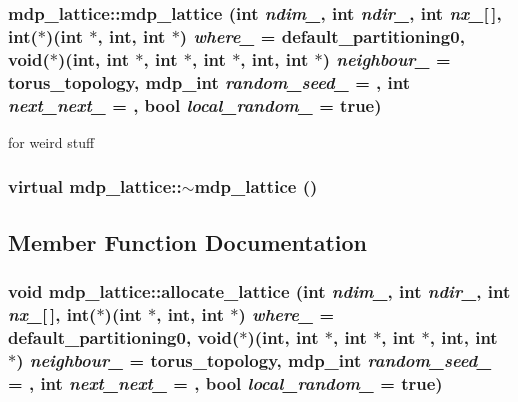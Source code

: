 \hypertarget{classmdp__lattice_afe2d9427fc47225722c0ab3314246a88}{
\subsubsection[{mdp\_\-lattice}]{\setlength{\rightskip}{0pt plus 5cm}mdp\_\-lattice::mdp\_\-lattice (int {\em ndim\_\-}, \/  int {\em ndir\_\-}, \/  int {\em nx\_\-}\mbox{[}$\,$\mbox{]}, \/  int($\ast$)(int $\ast$, int, int $\ast$) {\em where\_\-} = {\ttfamily default\_\-partitioning0}, \/  void($\ast$)(int, int $\ast$, int $\ast$, int $\ast$, int, int $\ast$) {\em neighbour\_\-} = {\ttfamily torus\_\-topology}, \/  {\bf mdp\_\-int} {\em random\_\-seed\_\-} = {}, \/  int {\em next\_\-next\_\-} = {}, \/  bool {\em local\_\-random\_\-} = {\ttfamily true})}}
\label{classmdp__lattice_afe2d9427fc47225722c0ab3314246a88}


for weird stuff \hypertarget{classmdp__lattice_a04eafca14369c88c7c469ffeb72e54ec}{
\subsubsection[{$\sim$mdp\_\-lattice}]{\setlength{\rightskip}{0pt plus 5cm}virtual mdp\_\-lattice::$\sim$mdp\_\-lattice ()}}
\label{classmdp__lattice_a04eafca14369c88c7c469ffeb72e54ec}


\subsection{Member Function Documentation}
\hypertarget{classmdp__lattice_a8e5ed5d10679379892b46f3359d5971c}{
\subsubsection[{allocate\_\-lattice}]{\setlength{\rightskip}{0pt plus 5cm}void mdp\_\-lattice::allocate\_\-lattice (int {\em ndim\_\-}, \/  int {\em ndir\_\-}, \/  int {\em nx\_\-}\mbox{[}$\,$\mbox{]}, \/  int($\ast$)(int $\ast$, int, int $\ast$) {\em where\_\-} = {\ttfamily default\_\-partitioning0}, \/  void($\ast$)(int, int $\ast$, int $\ast$, int $\ast$, int, int $\ast$) {\em neighbour\_\-} = {\ttfamily torus\_\-topology}, \/  {\bf mdp\_\-int} {\em random\_\-seed\_\-} = {}, \/  int {\em next\_\-next\_\-} = {}, \/  bool {\em local\_\-random\_\-} = {\ttfamily true})}}
\label{classmdp__lattice_a8e5ed5d10679379892b46f3359d5971c}


